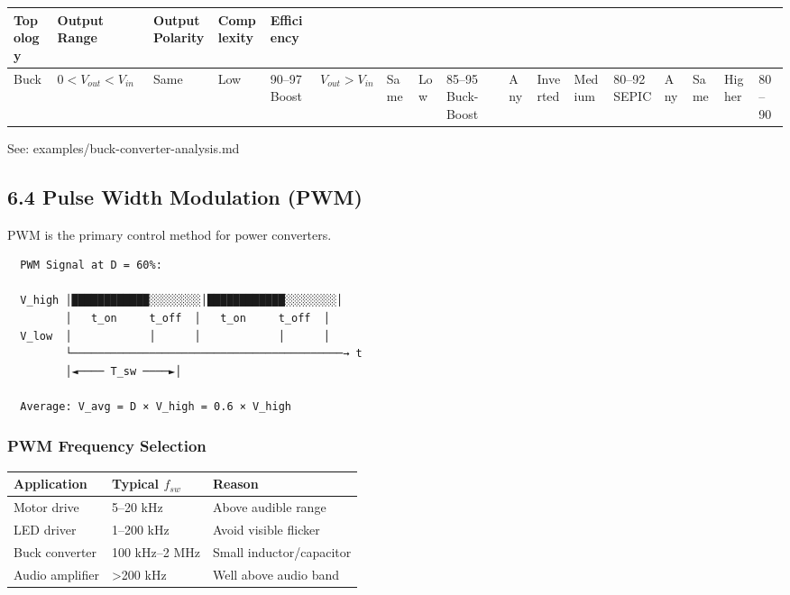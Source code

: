 \documentclass[11pt,a4paper]{book}
\begin{document}
\begin{center}
\begin{tabular}{|l|l|l|l|l|}
\hline
Topology & Output Range & Output Polarity & Complexity & Efficiency \\
\hline
Buck & $0 < V_{out} < V_{in}$ & Same & Low & 90–97%
Boost & $V_{out} > V_{in}$ & Same & Low & 85–95%
Buck-Boost & Any & Inverted & Medium & 80–92%
SEPIC & Any & Same & Higher & 80–90%
\hline
\end{tabular}
\end{center}

See: examples/buck-converter-analysis.md

\medskip\noindent\hrulefill\medskip

\subsection{6.4 Pulse Width Modulation (PWM)}

PWM is the primary control method for power converters.

\begin{lstlisting}
  PWM Signal at D = 60%:
  
  V_high │████████████░░░░░░░░│████████████░░░░░░░░│
         │   t_on     t_off  │   t_on     t_off  │
  V_low  │            │      │            │      │
         └──────────────────────────────────────────→ t
         │◄──── T_sw ────►│
         
  Average: V_avg = D × V_high = 0.6 × V_high
\end{lstlisting}

\subsubsection{PWM Frequency Selection}

\begin{center}
\begin{tabular}{|l|l|l|}
\hline
Application & Typical $f_{sw}$ & Reason \\
\hline
Motor drive & 5–20 kHz & Above audible range \\
LED driver & 1–200 kHz & Avoid visible flicker \\
Buck converter & 100 kHz–2 MHz & Small inductor/capacitor \\
Audio amplifier & >200 kHz & Well above audio band \\
\hline
\end{tabular}
\end{center}
\end{document}
